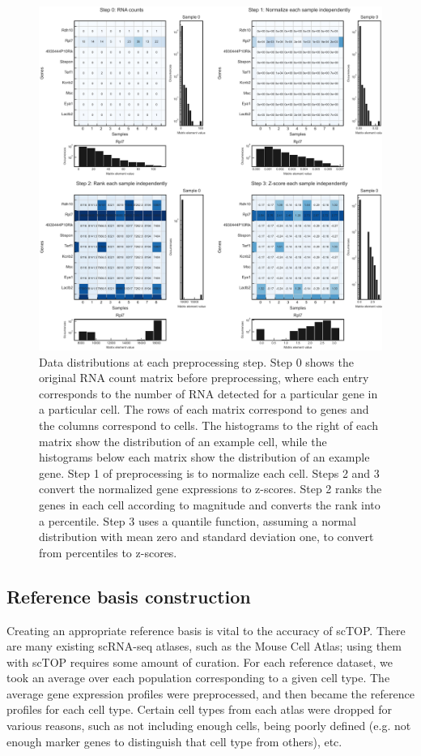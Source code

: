 \documentclass[aps,superscriptaddress, notitlepage,longbibliography]{revtex4-1}
\begin{document}
\begin{figure}
	\centering
		\includegraphics[scale=0.6]{figs/fig1a supplement.pdf}
	\caption{Data distributions at each preprocessing step. Step 0 shows the original RNA count matrix before preprocessing, where each entry corresponds to the number of RNA detected for a particular gene in a particular cell. The rows of each matrix correspond to genes and the columns correspond to cells. The histograms to the right of each matrix show the distribution of an example cell, while the histograms below each matrix show the distribution of an example gene. Step 1 of preprocessing is to normalize each cell. Steps 2 and 3 convert the normalized gene expressions to z-scores. Step 2 ranks the genes in each cell according to magnitude and converts the rank into a percentile. Step 3 uses a quantile function, assuming a normal distribution with mean zero and standard deviation one, to convert from percentiles to z-scores.}
	\label{FIG:supp1}
\end{figure}

\subsection{Reference basis construction}
Creating an appropriate reference basis is vital to the accuracy of scTOP. There are many existing scRNA-seq atlases, such as the Mouse Cell Atlas; using them with scTOP requires some amount of curation. For each reference dataset, we took an average over each population corresponding to a given cell type. The average gene expression profiles were preprocessed, and then became the reference profiles for each cell type. Certain cell types from each atlas were dropped for various reasons, such as not including enough cells, being poorly defined (e.g. not enough marker genes to distinguish that cell type from others), etc.
\end{document}
